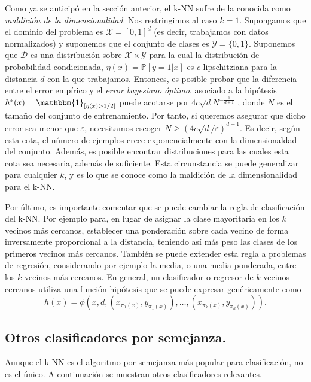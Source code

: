 Como ya se anticipó en la sección anterior, el k-NN sufre de la conocida como \emph{maldición de la dimensionalidad}. Nos restringimos al caso $k=1$. Supongamos que el dominio del problema es $\mathcal{X} = [0,1]^d$ (es decir, trabajamos con datos normalizados) y suponemos que el conjunto de clases es $\mathcal{Y} = \{0,1\}$. Suponemos que $\mathcal{D}$ es una distribución sobre $\mathcal{X}\times\mathcal{Y}$ para la cual la distribución de probabilidad condicionada, $\eta(x) = \mathbb{P}[y=1|x]$ es $c$-lipschitziana para la distancia $d$ con la que trabajamos. Entonces, es posible probar que la diferencia entre el error empírico y el \emph{error bayesiano óptimo}, asociado a la hipótesis $h^*(x) = \mathbbm{1}_{[\eta(x) > 1/2]}$ puede acotarse por $4c \sqrt{d} N^{-\frac{1}{d+1}}$ \cite{understandingml}, donde $N$ es el tamaño del conjunto de entrenamiento. Por tanto, si queremos asegurar que dicho error sea menor que $\varepsilon$, necesitamos escoger $N \ge (4c\sqrt{d}/\varepsilon)^{d+1}$. Es decir, según esta cota, el número de ejemplos crece exponencialmente con la dimensionaldad del conjunto. Además, es posible encontrar distribuciones para las cuales esta cota sea necesaria, además de suficiente. Esta circunstancia se puede generalizar para cualquier $k$, y es lo que se conoce como la maldición de la dimensionalidad para el k-NN. 

Por último, es importante comentar que se puede cambiar la regla de clasificación del k-NN. Por ejemplo para, en lugar de asignar la clase mayoritaria en los $k$ vecinos más cercanos, establecer una ponderación sobre cada vecino de forma inversamente proporcional a la distancia, teniendo así más peso las clases de los primeros vecinos más cercanos. También se puede extender esta regla a problemas de regresión, considerando por ejemplo la media, o una media ponderada, entre los $k$ vecinos más cercanos. En general, un clasificador o regresor de $k$ vecinos cercanos utiliza una función hipótesis que se puede expresar genéricamente como
\[ h(x) = \phi(x,d,(x_{\pi_1(x)},y_{\pi_1(x)}),\dots,(x_{\pi_k(x)},y_{\pi_k(x)})). \]

\subsection{Otros clasificadores por semejanza.}

Aunque el k-NN es el algoritmo por semejanza más popular para clasificación, no es el único. A continuación se muestran otros clasificadores relevantes.

